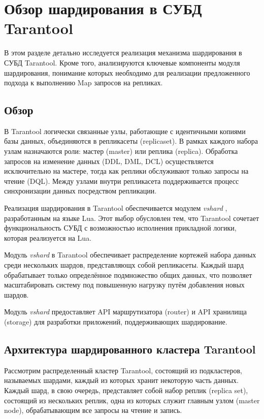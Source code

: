 \section{Обзор шардирования в СУБД Tarantool}

В этом разделе детально исследуется реализация механизма шардирования в СУБД
Tarantool. Кроме того, анализируются ключевые компоненты модуля шардирования,
понимание которых необходимо для реализации предложенного подхода к выполнению
Map запросов на репликах.

\subsection{Обзор}

В Tarantool логически связанные узлы, работающие с идентичными копиями базы
данных, объединяются в репликасеты (replicaset). В рамках каждого набора узлам
назначаются роли: мастер (master) или реплика (replica). Обработка запросов
на изменение данных (DDL, DML, DCL) осуществляется исключительно на мастере,
тогда как реплики обслуживают только запросы на чтение (DQL). Между узлами
внутри репликасета поддерживается процесс синхронизации данных посредством
репликации.

Реализация шардирования в Tarantool обеспечивается модулем \textit{vshard}
\cite{VshardGithub}, разработанным на языке Lua. Этот выбор обусловлен тем, что
Tarantool сочетает функциональность СУБД с возможностью исполнения прикладной
логики, которая реализуется на Lua.

Модуль \textit{vshard} в Tarantool обеспечивает распределение кортежей набора
данных среди нескольких шардов, представляющх собой репликасеты. Каждый шард
обрабатывает только определённое подмножество общих данных, что позволяет
масштабировать систему под повышенную нагрузку путём добавления новых шардов.

Модуль \textit{vshard} предоставляет API маршрутизатора (router) и
API хранилища (storage) для разработки приложений, поддерживающих
шардирование.

\subsection{Архитектура шардированного кластера Tarantool}

Рассмотрим распределенный кластер Tarantool, состоящий из подкластеров,
называемых шардами, каждый из которых хранит некоторую часть данных. Каждый
шард, в свою очередь, представляет собой набор реплик (replica set), состоящий
из нескольких реплик, одна из которых служит главным узлом (master node),
обрабатывающим все запросы на чтение и запись.

